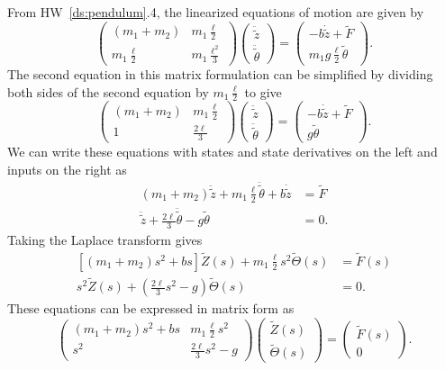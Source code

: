 
From HW~\ref{ds:pendulum}.4, the linearized equations of motion are given by
\[
\begin{pmatrix} (m_1+m_2) & m_1 \frac{\ell}{2} \\
m_1 \frac{\ell}{2} & m_1 \frac{\ell^2}{3} \end{pmatrix}\begin{pmatrix}
\ddot{\tilde{z}} \\ \ddot{\tilde{\theta}} \end{pmatrix}  =
\begin{pmatrix} -b\dot{\tilde{z}} + \tilde{F} 
	  \\
	m_1 g \frac{\ell}{2} \tilde{\theta} \end{pmatrix}.
\]
%
The second equation in this matrix formulation can be simplified by dividing both sides of the second equation by $m_1 \frac{\ell}{2}$ to give
\[
\begin{pmatrix} (m_1+m_2) & m_1 \frac{\ell}{2} \\
1 &  \frac{2 \ell}{3} \end{pmatrix}\begin{pmatrix}
\ddot{\tilde{z}} \\ \ddot{\tilde{\theta}} \end{pmatrix}  =
\begin{pmatrix} -b\dot{\tilde{z}} + \tilde{F} 
	  \\
	g \tilde{\theta} \end{pmatrix}.
\]
%
We can write these equations with states and state derivatives on the left and inputs on the right as
\begin{align*}
(m_1+ m_2) \ddot{\tilde{z}} + m_1\frac{\ell}{2} \ddot{\tilde{\theta}} + b\dot{\tilde{z}} &= \tilde{F} \\
\ddot{\tilde{z}} + \frac{2\ell}{3} \ddot{\tilde{\theta}} - g{\tilde{\theta}} &= 0 .
\end{align*}
%
Taking the Laplace transform gives
\begin{align*}
\left[ (m_1+m_2) s^2 + b s \right] \tilde{Z}(s) + m_1\frac{\ell}{2} s^2 \tilde{\Theta}(s) &= \tilde{F}(s) \\
s^2 \tilde{Z}(s) + \left(\frac{2 \ell}{3} s^2 - g \right)\tilde{\Theta}(s) &= 0 .
\end{align*}
%
These equations can be expressed in matrix form as
\[
\begin{pmatrix} (m_1+m_2)s^2 + bs & m_1 \frac{\ell}{2}s^2 \\
s^2 & \frac{2 \ell}{3}s^2-g \end{pmatrix}\begin{pmatrix}
\tilde{Z}(s) \\ \tilde{\Theta}(s) \end{pmatrix}  =
\begin{pmatrix} \tilde{F}(s) \\
	0 \end{pmatrix}.
\]
